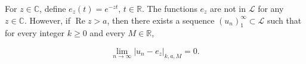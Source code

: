 For $z \in \mathbb{C}$, define $e_z(t) = e^{-zt}$, $t \in \mathbb{R}$. The functions $e_z$ are not in $\mathcal{L}$ for any $z \in \mathbb{C}$. However, if $\operatorname{Re} z > a$, then there exists a sequence $(u_n)_{1}^{\infty} \subset \mathcal{L}$ such that for every integer $k \geq 0$ and every $M \in \mathbb{R}$,

$$\lim_{n \to \infty} |u_n - e_z|_{k,a,M} = 0.$$

